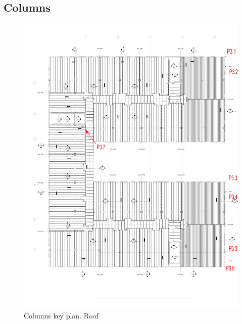 \subsection{Columns}

\begin{figure}
  \begin{center}
  \includegraphics[width=120mm]{figures/columns_key_plan_roof}
  \end{center}
  \caption{Columns key plan. Roof}\label{fg_columns_key_plan_roof}
\end{figure}


